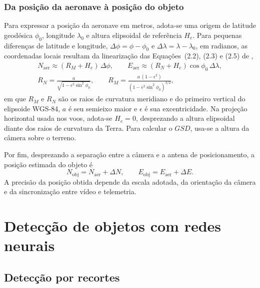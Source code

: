 \subsubsection{Da posição da aeronave à posição do objeto}

Para expressar a posição da aeronave em metros, adota-se uma origem de latitude geodésica $\phi_0$, longitude $\lambda_0$ e altura elipsoidal de referência $H_e$. Para pequenas diferenças de latitude e longitude, $\Delta\phi=\phi-\phi_0$ e $\Delta\lambda=\lambda-\lambda_0$, em radianos, as coordenadas locais resultam da linearização das Equações~(2.2), (2.3) e (2.5) de ,
\begin{equation}
  \begin{gathered}
    N_{\mathrm{aer}} \approx (R_M+H_e)\,\Delta\phi, \qquad
    E_{\mathrm{aer}} \approx (R_N+H_e)\cos\phi_0\,\Delta\lambda, \\
    R_N = \frac{a}{\sqrt{1 - \epsilon^{2}\sin^{2}\phi_0}}, \qquad
    R_M = \frac{a\,(1-\epsilon^{2})}{(1 - \epsilon^{2}\sin^{2}\phi_0)^{3/2}},
  \end{gathered}
  \label{eq_raios}
\end{equation}
em que $R_M$ e $R_N$ são os raios de curvatura meridiano e do primeiro vertical do elipsoide WGS-84, $a$ é seu semieixo maior e $\epsilon$ é sua excentricidade. Na projeção horizontal usada nos voos, adota-se $H_e=0$, desprezando a altura elipsoidal diante dos raios de curvatura da Terra. Para calcular o $GSD$, usa-se a altura da câmera sobre o terreno.

Por fim, desprezando a separação entre a câmera e a antena de posicionamento, a posição estimada do objeto é
\begin{equation*}
  N_{\mathrm{obj}} = N_{\mathrm{aer}} + \Delta N,
  \qquad
  E_{\mathrm{obj}} = E_{\mathrm{aer}} + \Delta E.
\end{equation*}
A precisão da posição obtida depende da escala adotada, da orientação da câmera e da sincronização entre vídeo e telemetria.

\section{Detecção de objetos com redes neurais}
\label{sec_deteccao}

\subsection{Detecção por recortes}

